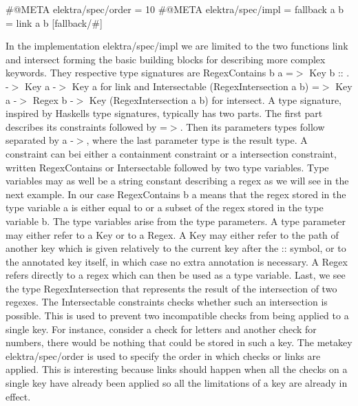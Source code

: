 \begin{DoxyCode}
#@META elektra/spec/order = 10
#@META elektra/spec/impl = fallback a b = link a b
[fallback/#]
\end{DoxyCode}


In the implementation {\ttfamily elektra/spec/impl} we are limited to the two functions {\ttfamily link} and {\ttfamily intersect} forming the basic building blocks for describing more complex keywords. They respective type signatures are {\ttfamily Regex\+Contains b a =$>$ Key b \+:\+: . -\/$>$ Key a -\/$>$ Key a} for {\ttfamily link} and {\ttfamily Intersectable (Regex\+Intersection a b) =$>$ Key a -\/$>$ Regex b -\/$>$ Key (Regex\+Intersection a b)} for {\ttfamily intersect}. A type signature, inspired by Haskell\textquotesingle{}s type signatures, typically has two parts. The first part describes its constraints followed by {\ttfamily =$>$}. Then its parameter\textquotesingle{}s types follow separated by a {\ttfamily -\/$>$}, where the last parameter type is the result type. A constraint can bei either a containment constraint or a intersection constraint, written {\ttfamily Regex\+Contains} or {\ttfamily Intersectable} followed by two type variables. Type variables may as well be a string constant describing a regex as we will see in the next example. In our case {\ttfamily Regex\+Contains b a} means that the regex stored in the type variable a is either equal to or a subset of the regex stored in the type variable b. The type variables arise from the type parameters. A type parameter may either refer to a {\ttfamily Key} or to a {\ttfamily Regex}. A {\ttfamily Key} may either refer to the path of another key which is given relatively to the current key after the {\ttfamily \+:\+:} symbol, or to the annotated key itself, in which case no extra annotation is necessary. A {\ttfamily Regex} refers directly to a regex which can then be used as a type variable. Last, we see the type {\ttfamily Regex\+Intersection} that represents the result of the intersection of two regexes. The {\ttfamily Intersectable} constraints checks whether such an intersection is possible. This is used to prevent two incompatible checks from being applied to a single key. For instance, consider a check for letters and another check for numbers, there would be nothing that could be stored in such a key. The metakey {\ttfamily elektra/spec/order} is used to specify the order in which checks or links are applied. This is interesting because links should happen when all the checks on a single key have already been applied so all the limitations of a key are already in effect.

